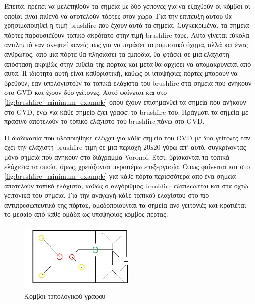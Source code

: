Έπειτα, πρέπει να μελετηθούν τα σημεία με δύο γείτονες για να εξαχθούν οι κόμβοι οι οποίοι είναι πιθανό να αποτελούν πόρτες στον χώρο. Για την επίτευξη αυτού θα χρησιμοποιηθεί η τιμή brushfire που έχουν αυτά τα σημεία. Συγκεκριμένα, τα σημεία πόρτες παρουσιάζουν τοπικό ακρότατο στην τιμή brushfire τους. Αυτό γίνεται εύκολα αντιληπτό εαν σκεφτεί κανείς πως για να περάσει το ρομποτικό όχημα, αλλά και ένας άνθρωπος, από μια πόρτα θα πλησιάσει τα εμπόδια, θα φτάσει σε μια ελάχιστη απόσταση ακριβώς στην ευθεία της πόρτας και μετά θα αρχίσει να απομακρύνεται από αυτά. Η ιδιότητα αυτή είναι καθοριστική, καθώς οι υποψήφιες πόρτες μπορούν να βρεθούν, εαν υπολογιστούν τα τοπικά ελάχιστα του brushfire στα σημεία που ανήκουν στο GVD και έχουν δύο γείτονες. Αυτό φαίνεται και στο \autoref{fig:brushfire_minimum_example} όπου έχουν επισημανθεί τα σημεία που ανήκουν στο GVD, ενώ για κάθε σημείο έχει γραφεί το brushfire του. Πράγματι τα σημεία με πράσινο αποτελούν το τοπικό ελάχιστο του brushfire πάνω στο GVD. 

Η διαδικασία που υλοποιήθηκε ελέγχει για κάθε σημείο του GVD με δύο γείτονες εαν έχει την ελάχιστη brushfire τιμή σε μια περιοχή 20x20 γύρω απ' αυτό, συγκρίνοντας μόνο σημειά που ανήκουν στο διάγραμμα Voronoi. Έτσι, βρίσκονται τα τοπικά ελάχιστα τα οποία, όμως, χρειάζονται περαιτέρω επεξεργασία. Όπως φαίνειται και στο \ref{fig:brushfire_minimum_example} για κάθε πόρτα περισσότερα από ένα σημεία αποτελούν τοπικό ελάχιστο, καθώς ο αλγόριθμος brushfire εξαπλώνεται και στα οχτώ γειτονικά του σημεία. Για την αναγωγή κάθε τοπικού ελαχίστου στο πιο αντιπροσωπευτικό της πόρτας, ομαδοποιούνται τα σημεία ανά γειτονιές και κρατιέται το μεσαίο από κάθε ομάδα ως υποψήφιος κόμβος πόρτας.

\begin{figure}[!htb]
    \centering
    \includegraphics[width=0.5\textwidth]{./images/chapter5/rooms_3_gvd_1_3_neighbors_pinned.png}
    \caption{Κόμβοι τοπολογικού γράφου}
    \label{fig:gvd_neighbors_example}
\end{figure}


